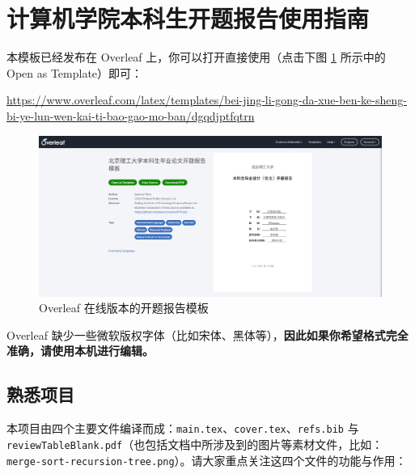 \section{计算机学院本科生开题报告使用指南} \label{proposal}

本模板已经发布在 Overleaf 上，你可以打开直接使用（点击下图 \ref{overleaf-proposal} 所示中的 Open as Template）即可：

\begin{center}
  \color{ForestGreen}\href{https://www.overleaf.com/latex/templates/bei-jing-li-gong-da-xue-ben-ke-sheng-bi-ye-lun-wen-kai-ti-bao-gao-mo-ban/dgqdjptfqtrn}{https://www.overleaf.com/latex/templates/bei-jing-li-gong-da-xue-ben-ke-sheng-bi-ye-lun-wen-kai-ti-bao-gao-mo-ban/dgqdjptfqtrn}
\end{center}

\begin{figure}[H]
  \centering
  \includegraphics[width=\textwidth]{images/overleaf.png}
  \caption{Overleaf 在线版本的开题报告模板}
  \label{overleaf-proposal}
\end{figure}

Overleaf 缺少一些微软版权字体（比如宋体、黑体等），\textbf{因此如果你希望格式完全准确，请使用本机进行编辑。}

\subsection{熟悉项目}

本项目由四个主要文件编译而成：\texttt{main.tex}、\texttt{cover.tex}、\texttt{refs.bib} 与\\ \texttt{reviewTableBlank.pdf}（也包括文档中所涉及到的图片等素材文件，比如：\\ \texttt{merge-sort-recursion-tree.png}）。请大家重点关注这四个文件的功能与作用：

